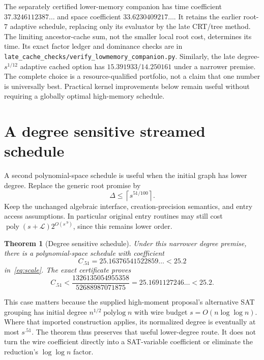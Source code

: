 \documentclass[11pt,letterpaper]{article}
\newtheorem{theorem}{Theorem}[section]\newtheorem{lemma}[theorem]{Lemma}\newtheorem{proposition}[theorem]{Proposition}\newtheorem{corollary}[theorem]{Corollary}
\theoremstyle{remark}\newtheorem{remark}[theorem]{Remark}
\newcommand{\poly}{\operatorname{poly}}\newcommand{\vTwo}{v_2}\newcommand{\ceil}[1]{\left\lceil#1\right\rceil}\newcommand{\floor}[1]{\left\lfloor#1\right\rfloor}\newcommand{\LL}{\mathcal L}\newcommand{\Pin}{ab2fbc9e03d5c3d0ad6dec8686960bfe498b0b06}
\begin{document}
The separately certified lower-memory companion has time coefficient
$37.3246112387\ldots$ and space coefficient $33.6230409217\ldots$. It retains
the earlier root-$7$ adaptive schedule, replacing only its evaluator by the
late CRT/tree method. The limiting ancestor-cache sum, not the smaller local
root cost, determines its time. Its exact factor ledger and dominance checks
are in \texttt{late\_cache\_checks/verify\_lowmemory\_companion.py}. Similarly, the late degree-$s^{1/12}$
adaptive cached option has $15.391933/14.250161$ under a narrower premise.
The complete choice is a resource-qualified portfolio, not a claim that one
number is universally best. Practical kernel improvements below remain useful
without requiring a globally optimal high-memory schedule.

\section{A degree sensitive streamed schedule}
\label{sec:lowdegree}
A second polynomial-space schedule is useful when the initial graph has lower degree. Replace the generic root promise by
\[
 \Delta\le\ceil{s^{51/100}}.
\]
Keep the unchanged algebraic interface, creation-precision semantics, and entry access assumptions. In particular original entry routines may still cost $\poly(s+\LL)2^{O(s^{.9})}$, since this remains lower order.

\begin{theorem}[Degree sensitive schedule]\label{thm:lowdegree}
Under this narrower degree premise, there is a polynomial-space schedule with coefficient
\[
 C_{.51}=25.16376541522859\ldots<25.2
\]
in~\eqref{eq:scale}. The exact certificate proves
\[
 C_{.51}<\frac{1326135054955358}{52688987071875}
 =25.1691127246\ldots<25.2.
\]
\end{theorem}
This case matters because the supplied high-moment proposal's alternative SAT grouping has initial degree $n^{1/2}\operatorname{polylog} n$ with wire budget $s=O(n\log\log n)$. Where that imported construction applies, its normalized degree is eventually at most $s^{.51}$. The theorem thus preserves that useful lower-degree route. It does not turn the wire coefficient directly into a SAT-variable coefficient or eliminate the reduction's $\log\log n$ factor.
\end{document}
